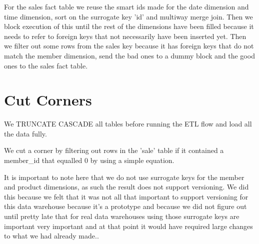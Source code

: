     For the sales fact table we reuse the smart ids made for the date dimension and time dimension, sort on the surrogate key 'id' and multiway merge join. Then we block execution of this until the rest of the dimensions have been filled because it needs to refer to foreign keys that not necessarily have been inserted yet. Then we filter out some rows from the sales key because it has foreign keys that do not match the member dimension, send the bad ones to a dummy block and the good ones to the sales fact table.
    
    \section{Cut Corners}
    We TRUNCATE CASCADE all tables before running the ETL flow and load all the data fully.
    
    We cut a corner by filtering out rows in the 'sale' table if it contained a member\_id that equalled 0 by using a simple equation.
    
    It is important to note here that we do not use surrogate keys for the member and product dimensions, as such the result does not support versioning. We did this because we felt that it was not all that important to support versioning for this data warehouse because it's a prototype and because we did not figure out until pretty late that for real data warehouses using those surrogate keys are important very important and at that point it would have required large changes to what we had already made..


